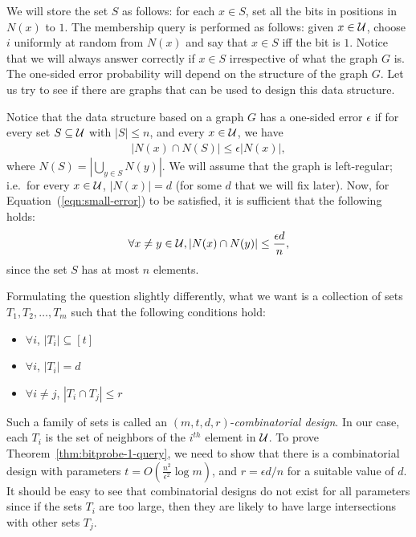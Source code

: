 We will store the set $S$ as follows: for each $x\in S$, set all the bits in
positions in $N(x)$ to $1$. The membership query is performed as follows: given
$x\in {\cal U}$, choose $i$ uniformly at random from $N(x)$ and say that
$x\in S$ iff the bit is $1$. Notice that we will always answer correctly if
$x\in S$ irrespective of what the graph $G$ is. The one-sided error probability
will depend on the structure of the graph $G$. Let us try to see if there are
graphs that can be used to design this data structure.

Notice that the data structure based on a graph $G$ has a one-sided error
$\epsilon$ if for every set $S\subseteq {\cal U}$ with $|S| \leq n$, and every
$x\in {\cal U}$, we have
\begin{align}
  |N(x) \cap N(S)| \leq \epsilon |N(x)|,
  \label{eqn:small-error}
\end{align}
where $N(S) = \left| \bigcup_{y\in S} N(y) \right|$. We will assume that the
graph is left-regular; i.e.\ for every $x\in {\cal U}$, $|N(x)| = d$ (for some
$d$ that we will fix later). Now, for Equation~(\ref{eqn:small-error}) to be
satisfied, it is sufficient that the following holds:
\begin{align}
  \forall x\neq y \in {\cal U}, |N(x) \cap N(y)| \leq \frac{\epsilon d}{n},
  \label{eqn:small-error-suff}
\end{align}
since the set $S$ has at most $n$ elements.

Formulating the question slightly differently, what we want is a collection of
sets $T_1, T_2, \ldots, T_m$ such that the following conditions hold:
\begin{itemize}
\item $\forall i$, $|T_i| \subseteq [t]$
\item $\forall i$, $|T_i| = d$
\item $\forall i\neq j$, $|T_i \cap T_j| \leq r$
\end{itemize}

Such a family of sets is called an $(m,t,d,r)$-\emph{combinatorial design}. In
our case, each $T_i$ is the set of neighbors of the $i^{th}$ element in
${\cal U}$. To prove Theorem~\ref{thm:bitprobe-1-query}, we need to show that
there is a combinatorial design with parameters
$t = O\left( \frac{n^2}{\epsilon^2}\log m \right)$, and $r = \epsilon d/n$ for a
suitable value of $d$. It should be easy to see that combinatorial designs do
not exist for all parameters since if the sets $T_i$ are too large, then they
are likely to have large intersections with other sets $T_j$.

